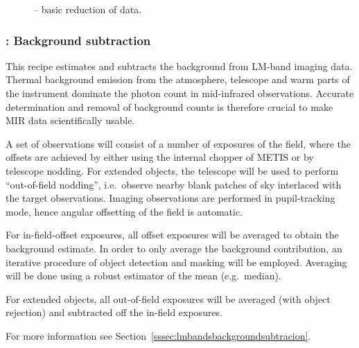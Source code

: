 \begin{figure}[hb]
  \centering
    \def \globalscale {0.700000}
    \fontsize{10}{12}\selectfont
    
  \caption[Recipe: ]{ --
    basic reduction of  data.}
  \label{fig:metis_lm_img_basic_reduce}
\end{figure}
\restoregeometry

\clearpage
\subsubsection{: Background subtraction}
\label{lm_img_background}
\label{rec:lm_img_background}
\label{sssec:lm_img_background}
\label{metis_lm_img_background}
\label{rec:metis_lm_img_background}
\label{sssec:metis_lm_img_background}

This recipe estimates and subtracts the background from LM-band
imaging data. Thermal background emission from the atmosphere,
telescope and warm parts of the instrument dominate the photon count
in mid-infrared observations. Accurate determination and removal of
background counts is therefore crucial to make MIR data scientifically
usable.

A set of observations will consist of a number of exposures
of the field, where the offsets are achieved by either using the internal
chopper of METIS or by telescope nodding. For extended objects, the
telescope will be used to perform ``out-of-field nodding'', i.e.\
observe nearby blank patches of sky interlaced with the target
observations. Imaging observations are performed in pupil-tracking
mode, hence angular offsetting of the field is automatic.

For in-field-offset exposures, all offset exposures will be
averaged to obtain the background estimate. In order to only average
the background contribution, an iterative procedure of object
detection and masking will be employed. Averaging will be done using a
robust estimator of the mean (e.g.\ median).

For extended objects, all out-of-field exposures will be averaged
(with object rejection) and subtracted off the in-field exposures.

For more information see Section~\ref{sssec:lmbandsbackgroundsubtracion}.


